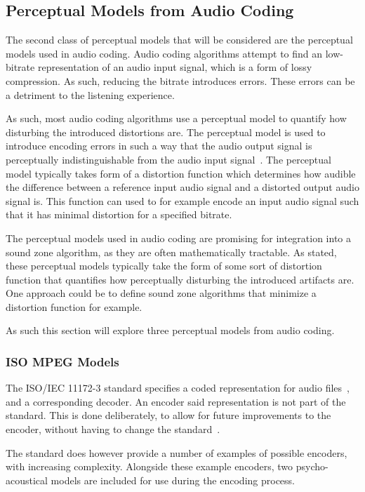 \subsection{Perceptual Models from Audio Coding }
\label{ch:perceptual:review:audio_coding}
The second class of perceptual models that will be considered are the perceptual models used in audio coding.
Audio coding algorithms attempt to find an low-bitrate representation of an audio input signal, which is a 
form of lossy compression.
As such, reducing the bitrate introduces errors.
These errors can be a detriment to the listening experience.

As such, most audio coding algorithms use a perceptual model to quantify how disturbing the introduced distortions are.
The perceptual model is used to introduce encoding errors in such a way that the audio output
signal is perceptually indistinguishable from the audio input signal~\cite{taal2012low}.
The perceptual model typically takes form of a distortion function which determines how
audible the difference between a reference input audio signal and a distorted output audio signal is.
This function can used to for example encode an input audio signal such that it has minimal distortion for a
specified bitrate.

The perceptual models used in audio coding are promising for integration into a sound zone algorithm, as they are 
often mathematically tractable.
As stated, these perceptual models typically take the form of some sort of distortion function that quantifies
how perceptually disturbing the introduced artifacts are. 
One approach could be to define sound zone algorithms that minimize a distortion function for example.

As such this section will explore three perceptual models from audio coding.

\subsubsection{ISO MPEG Models}
The ISO/IEC 11172-3 standard specifies a coded representation for audio files~\cite{ISO11172-3}, 
and a corresponding decoder.
An encoder said representation is not part of the standard.
This is done deliberately, to allow for future improvements to the encoder, without having to change the standard~\cite{pan1995tutorial}.

The standard does however provide a number of examples of possible encoders, with increasing complexity.
Alongside these example encoders, two psycho-acoustical models are included for use during the encoding process. 

